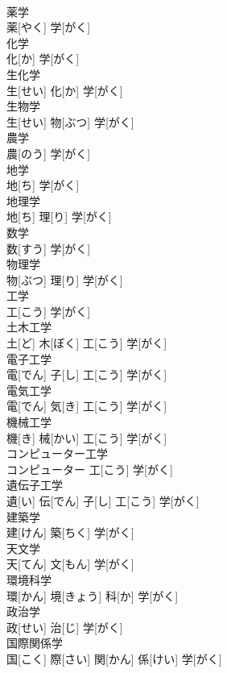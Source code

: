 \documentclass[8pt]{extreport}
\begin{document}
\begin{CJK}{UTF8}{min}
\\	薬学	
\\	薬[やく] 学[がく]		
\\	化学	
\\	化[か] 学[がく]		
\\	生化学	
\\	生[せい] 化[か] 学[がく]		
\\	生物学	
\\	生[せい] 物[ぶつ] 学[がく]		
\\	農学	
\\	農[のう] 学[がく]		
\\	地学	
\\	地[ち] 学[がく]		
\\	地理学	
\\	地[ち] 理[り] 学[がく]		
\\	数学	
\\	数[すう] 学[がく]		
\\	物理学	
\\	物[ぶつ] 理[り] 学[がく]		
\\	工学	
\\	工[こう] 学[がく]		
\\	土木工学	
\\	土[ど] 木[ぼく] 工[こう] 学[がく]		
\\	電子工学	
\\	電[でん] 子[し] 工[こう] 学[がく]		
\\	電気工学	
\\	電[でん] 気[き] 工[こう] 学[がく]		
\\	機械工学	
\\	機[き] 械[かい] 工[こう] 学[がく]		
\\	コンピューター工学	
\\	コンピューター 工[こう] 学[がく]		
\\	遺伝子工学	
\\	遺[い] 伝[でん] 子[し] 工[こう] 学[がく]		
\\	建築学	
\\	建[けん] 築[ちく] 学[がく]		
\\	天文学	
\\	天[てん] 文[もん] 学[がく]		
\\	環境科学	
\\	環[かん] 境[きょう] 科[か] 学[がく]		
\\	政治学	
\\	政[せい] 治[じ] 学[がく]		
\\	国際関係学	
\\	国[こく] 際[さい] 関[かん] 係[けい] 学[がく]		

\end{CJK}
\end{document}
